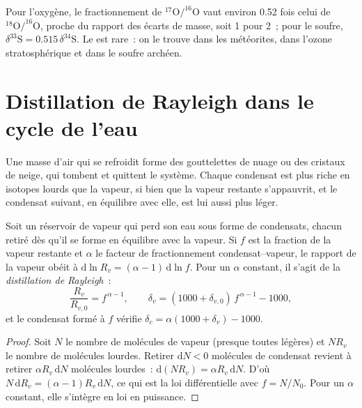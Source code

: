 Pour l'oxygène, le fractionnement de $^{17}\mathrm O/^{16}\mathrm O$ vaut environ 0.52 fois celui
de $^{18}\mathrm O/^{16}\mathrm O$, proche du rapport des écarts de masse, soit 1 pour 2~;
pour le soufre, $\delta^{33}\mathrm S = 0.515\,\delta^{34}\mathrm S$. Le  est rare~: on le trouve dans les météorites, dans l'ozone stratosphérique et
dans le soufre archéen.

\section{Distillation de Rayleigh dans le cycle de l'eau}\label{sec:b3:stable-isotopes:rayleigh}

Une masse d'air qui se refroidit forme des gouttelettes de nuage ou des cristaux de neige, qui tombent et
quittent le système. Chaque condensat est plus riche en isotopes lourds que la vapeur, si bien que la
vapeur restante s'appauvrit, et le condensat suivant, en équilibre avec elle, est
lui aussi plus léger.

\begin{proposition}\label{prop:b3:stable-isotopes:rayleigh-distillation}
Soit un réservoir de vapeur qui perd son eau sous forme de condensats, chacun retiré dès
qu'il se forme en équilibre avec la vapeur. Si $f$ est la fraction de la
vapeur restante et $\alpha$ le facteur de fractionnement condensat--vapeur, le
rapport de la vapeur obéit à $\mathrm d\ln R_v = (\alpha - 1)\,\mathrm d\ln f$. Pour
un $\alpha$ constant, il s'agit de la \emph{distillation
de Rayleigh}~:
\[
\frac{R_v}{R_{v,0}} = f^{\,\alpha - 1}, \qquad
\delta_v = (1000 + \delta_{v,0})\,f^{\,\alpha - 1} - 1000,
\]
et le condensat formé à $f$ vérifie $\delta_c = \alpha(1000 + \delta_v) - 1000$.
\end{proposition}

\begin{proof}
Soit $N$ le nombre de molécules de vapeur (presque toutes légères) et $N R_v$
le nombre de molécules lourdes. Retirer $\mathrm dN < 0$ molécules de condensat
revient à retirer $\alpha R_v\,\mathrm dN$ molécules lourdes~: $\mathrm d(NR_v) = \alpha
R_v\,\mathrm dN$. D'où $N\,\mathrm dR_v = (\alpha - 1)R_v\,\mathrm dN$, ce qui est la
loi différentielle avec $f = N/N_0$. Pour un $\alpha$ constant, elle s'intègre en
loi en puissance.
\end{proof}

